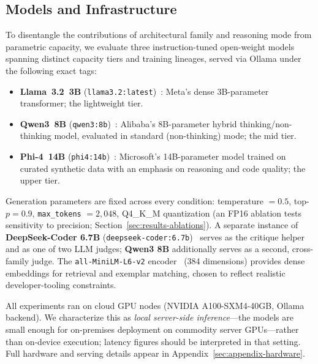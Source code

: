 \documentclass[pdflatex,sn-mathphys-ay]{sn-jnl}%
\theoremstyle{thmstyleone}%
\theoremstyle{thmstyletwo}%
\theoremstyle{thmstylethree}%
\begin{document}
\subsection{Models and Infrastructure}
\label{sec:models-hardware}
{\color{blue}
To disentangle the contributions of architectural family and reasoning mode from parametric capacity, we evaluate three instruction-tuned open-weight models spanning distinct capacity tiers and training lineages, served via Ollama under the following exact tags:
\begin{itemize}
    \item \textbf{Llama~3.2~3B} (\texttt{llama3.2:latest})~\citep{grattafiori2024llama3herdmodels}: Meta's dense 3B-parameter transformer; the lightweight tier.
    \item \textbf{Qwen3~8B} (\texttt{qwen3:8b})~\citep{yang2025qwen3technicalreport}: Alibaba's 8B-parameter hybrid thinking/non-thinking model, evaluated in standard (non-thinking) mode; the mid tier.
    \item \textbf{Phi-4~14B} (\texttt{phi4:14b})~\citep{abdin2024phi4technicalreport}: Microsoft's 14B-parameter model trained on curated synthetic data with an emphasis on reasoning and code quality; the upper tier.
\end{itemize}
Generation parameters are fixed across every condition: temperature $=0.5$, top-$p=0.9$, \texttt{max\_tokens} $=2{,}048$, Q4\_K\_M quantization (an FP16 ablation tests sensitivity to precision; Section~\ref{sec:results-ablations}). A separate instance of \textbf{DeepSeek-Coder 6.7B} (\texttt{deepseek-coder:6.7b})~\citep{deepseekcoderv2} serves as the critique helper and as one of two LLM judges; \textbf{Qwen3 8B} additionally serves as a second, cross-family judge. The \texttt{all-MiniLM-L6-v2} encoder~\citep{reimers-gurevych-2019-sentence} (384 dimensions) provides dense embeddings for retrieval and exemplar matching, chosen to reflect realistic developer-tooling constraints.

All experiments ran on cloud GPU nodes (NVIDIA A100-SXM4-40GB, Ollama backend). We characterize this as \emph{local server-side inference}---the models are small enough for on-premises deployment on commodity server GPUs---rather than on-device execution; latency figures should be interpreted in that setting. Full hardware and serving details appear in Appendix~\ref{sec:appendix-hardware}.


}
\end{document}
